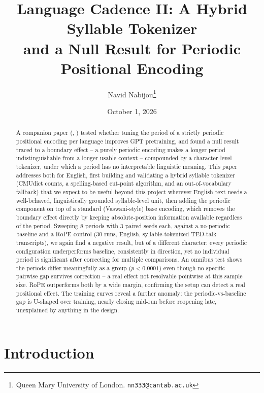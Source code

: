 \documentclass[11pt]{article}
\title{Language Cadence II: A Hybrid Syllable Tokenizer\\ and a Null Result for Periodic Positional Encoding}
\author{Navid Nabijou\thanks{Queen Mary University of London. \texttt{nn333@cantab.ac.uk}}}
\date{October 1, 2026}
\begin{document}
\maketitle

\begin{abstract}
A companion paper (\citeauthor{nabijou2026}, \citeyear{nabijou2026}) tested whether tuning the period of a strictly periodic positional encoding per language improves GPT pretraining, and found a null result traced to a boundary effect -- a purely periodic encoding makes a longer period indistinguishable from a longer usable context -- compounded by a character-level tokenizer, under which a period has no interpretable linguistic meaning. This paper addresses both for English, first building and validating a hybrid syllable tokenizer (CMUdict counts, a spelling-based cut-point algorithm, and an out-of-vocabulary fallback) that we expect to be useful beyond this project wherever English text needs a well-behaved, linguistically grounded syllable-level unit, then adding the periodic component on top of a standard (Vaswani-style) base encoding, which removes the boundary effect directly by keeping absolute-position information available regardless of the period. Sweeping 8 periods with 3 paired seeds each, against a no-periodic baseline and a RoPE control (30 runs, English, syllable-tokenized TED-talk transcripts), we again find a negative result, but of a different character: every periodic configuration underperforms baseline, consistently in direction, yet no individual period is significant after correcting for multiple comparisons. An omnibus test shows the periods differ meaningfully as a group ($p<0.0001$) even though no specific pairwise gap survives correction -- a real effect not resolvable pointwise at this sample size. RoPE outperforms both by a wide margin, confirming the setup can detect a real positional effect. The training curves reveal a further anomaly: the periodic-vs-baseline gap is U-shaped over training, nearly closing mid-run before reopening late, unexplained by anything in the design.
\end{abstract}

\section{Introduction}
\label{sec:intro}
\end{document}

